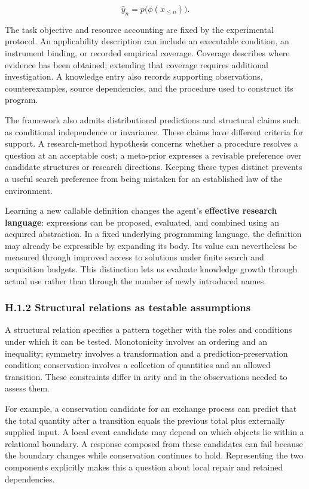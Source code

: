 \documentclass[twoside,11pt]{article}
\begin{document}
\[
\hat y_n=p\bigl(\phi(x_{\leq n})\bigr).
\]


The task objective and resource accounting are fixed by the experimental protocol. An applicability description can include an executable condition, an instrument binding, or recorded empirical coverage. Coverage describes where evidence has been obtained; extending that coverage requires additional investigation. A knowledge entry also records supporting observations, counterexamples, source dependencies, and the procedure used to construct its program.


The framework also admits distributional predictions and structural claims such as conditional independence or invariance. These claims have different criteria for support. A research-method hypothesis concerns whether a procedure resolves a question at an acceptable cost; a meta-prior expresses a revisable preference over candidate structures or research directions. Keeping these types distinct prevents a useful search preference from being mistaken for an established law of the environment.


Learning a new callable definition changes the agent's \textbf{effective research language}: expressions can be proposed, evaluated, and combined using an acquired abstraction. In a fixed underlying programming language, the definition may already be expressible by expanding its body. Its value can nevertheless be measured through improved access to solutions under finite search and acquisition budgets. This distinction lets us evaluate knowledge growth through actual use rather than through the number of newly introduced names.


\subsubsection*{H.1.2 Structural relations as testable assumptions}

A structural relation specifies a pattern together with the roles and conditions under which it can be tested. Monotonicity involves an ordering and an inequality; symmetry involves a transformation and a prediction-preservation condition; conservation involves a collection of quantities and an allowed transition. These constraints differ in arity and in the observations needed to assess them.


For example, a conservation candidate for an exchange process can predict that the total quantity after a transition equals the previous total plus externally supplied input. A local event candidate may depend on which objects lie within a relational boundary. A response composed from these candidates can fail because the boundary changes while conservation continues to hold. Representing the two components explicitly makes this a question about local repair and retained dependencies.
\end{document}
